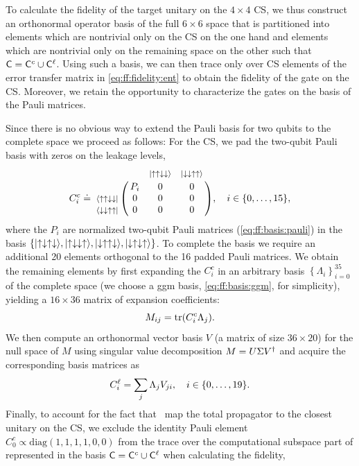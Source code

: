 To calculate the fidelity of the target unitary on the $4\times 4$ CS, we thus construct an orthonormal operator basis \basis of the full $6\times 6$ space that is partitioned into elements which are nontrivial only on the CS on the one hand and elements which are nontrivial only on the remaining space on the other such that $\mathsf{C} = \mathsf{C}^c\cup\mathsf{C}^\ell$.
Using such a basis, we can then trace only over CS elements of the error transfer matrix \liouvUe in \cref{eq:ff:fidelity:ent} to obtain the fidelity of the gate on the CS.
Moreover, we retain the opportunity to characterize the gates on the basis of the Pauli matrices.

Since there is no obvious way to extend the Pauli basis for two qubits to the complete space we proceed as follows: For the CS, we pad the two-qubit Pauli basis with zeros on the leakage levels, \ie
\begin{equation}\label{eq:ff:basis:cnot}
    C_i^c\doteq\bordermatrix{~                       &     & \footnotesize{\ketuudd} & \footnotesize{\ketdduu} \cr
                                                     & P_i & 0                       & 0                       \cr
                             \footnotesize{\brauudd} & 0   & 0                       & 0                       \cr
                             \footnotesize{\bradduu} & 0   & 0                       & 0                       \cr}
    \qcomma{i\in\{0,\dotsc,15\}},
\end{equation}
where the $P_i$ are normalized two-qubit Pauli matrices (\cf \cref{eq:ff:basis:pauli}) in the basis $\lbrace\mbox{\ensuremath{\ket{\uparrow\downarrow\uparrow\downarrow}}},\mbox{\ensuremath{\ket{\uparrow\downarrow\downarrow\uparrow}}},\mbox{\ensuremath{\ket{\downarrow\uparrow\uparrow\downarrow}}},\mbox{\ensuremath{\ket{\downarrow\uparrow\downarrow\uparrow}}}\rbrace$.
To complete the basis we require an additional 20 elements orthogonal to the 16 padded Pauli matrices.
We obtain the remaining elements by first expanding the $C_i^c$ in an arbitrary basis $\left\lbrace\Lambda_i\right\rbrace_{i=0}^{35}$ of the complete space (we choose a \gls{ggm} basis, \cref{eq:ff:basis:ggm}, for simplicity), yielding a $16\times 36$ matrix of expansion coefficients:
\begin{equation}
    M_{ij} = \tr(C_i^c\Lambda_j).
\end{equation}
We then compute an orthonormal vector basis $V$ (a matrix of size $36\times 20$) for the null space of $M$ using singular value decomposition $M = U\Sigma V^\dagger$ and acquire the corresponding basis matrices as
\begin{equation}
    C_i^\ell = \sum_j\Lambda_j V_{ji}\qcomma{i\in\lbrace 0,\dotsc,19\rbrace}.
\end{equation}
Finally, to account for the fact that~ map the total propagator to the closest unitary on the CS, we exclude the identity Pauli element $C_0^c\propto\text{diag}(1, 1, 1, 1, 0, 0)$ from the trace over the computational subspace part of \liouvUe represented in the basis $\mathsf{C} = \mathsf{C}^c\cup\mathsf{C}^\ell$ when calculating the fidelity,
